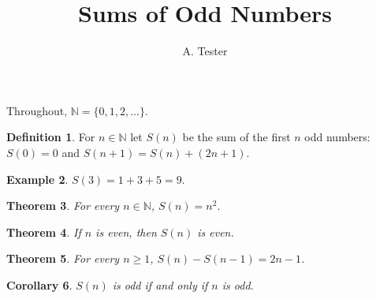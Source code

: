 \documentclass[11pt]{article}
\title{Sums of Odd Numbers}
\author{A. Tester}
\date{}
\newtheorem{thm}{Theorem}
\newtheorem{cor}[thm]{Corollary}
\theoremstyle{definition}
\newtheorem{definition}[thm]{Definition}
\newtheorem{example}[thm]{Example}
\begin{document}
\maketitle

Throughout, $\mathbb{N} = \{0, 1, 2, \dots\}$.

\begin{definition}
For $n \in \mathbb{N}$ let $S(n)$ be the sum of the first $n$ odd numbers:
$S(0) = 0$ and $S(n+1) = S(n) + (2n+1)$.
\end{definition}

\begin{example}
$S(3) = 1 + 3 + 5 = 9$.
\end{example}

\begin{thm}\label{thm:sq}
For every $n \in \mathbb{N}$, $S(n) = n^2$.
\end{thm}

\begin{thm}\label{thm:even}
If $n$ is even, then $S(n)$ is even.
\end{thm}

\begin{thm}\label{thm:diff}
For every $n \geq 1$, $S(n) - S(n-1) = 2n - 1$.
\end{thm}

\begin{cor}
$S(n)$ is odd if and only if $n$ is odd.
\end{cor}
\end{document}
